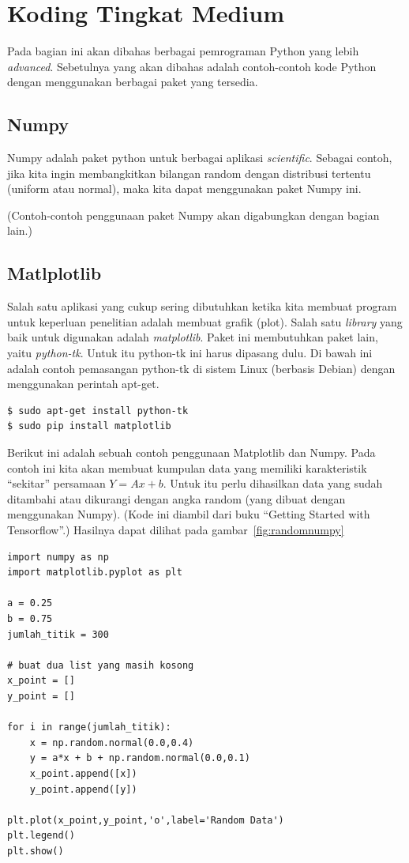 \chapter{Koding Tingkat Medium}
Pada bagian ini akan dibahas berbagai pemrograman Python yang lebih {\em advanced}. Sebetulnya yang akan dibahas adalah contoh-contoh kode Python dengan menggunakan berbagai paket yang tersedia.

\section{Numpy}
Numpy adalah paket python untuk berbagai aplikasi {\em scientific}. Sebagai contoh, jika kita ingin membangkitkan bilangan random dengan distribusi tertentu (uniform atau normal), maka kita dapat menggunakan paket Numpy ini.

(Contoh-contoh penggunaan paket Numpy akan digabungkan dengan bagian lain.)

\section{Matlplotlib}
Salah satu aplikasi yang cukup sering dibutuhkan ketika kita membuat program untuk keperluan penelitian adalah membuat grafik (plot). Salah satu {\em library} yang baik untuk digunakan adalah {\em matplotlib}. Paket ini membutuhkan paket lain, yaitu {\em python-tk}. Untuk itu python-tk ini harus dipasang dulu. Di bawah ini adalah contoh pemasangan python-tk di sistem Linux (berbasis Debian) dengan menggunakan perintah apt-get.

\begin{verbatim}
$ sudo apt-get install python-tk
$ sudo pip install matplotlib
\end{verbatim}

Berikut ini adalah sebuah contoh penggunaan Matplotlib dan Numpy. Pada contoh ini kita akan membuat kumpulan data yang memiliki karakteristik ``sekitar'' persamaan 
$Y = Ax + b$.
Untuk itu perlu dihasilkan data yang sudah ditambahi atau dikurangi dengan angka random (yang dibuat dengan menggunakan Numpy). (Kode ini diambil dari buku ``Getting Started with Tensorflow''\cite{tensorflowstarted}.)
Hasilnya dapat dilihat pada gambar~\ref{fig:randomnumpy}


\begin{verbatim}
import numpy as np
import matplotlib.pyplot as plt

a = 0.25
b = 0.75
jumlah_titik = 300

# buat dua list yang masih kosong
x_point = []
y_point = []

for i in range(jumlah_titik):
    x = np.random.normal(0.0,0.4)
    y = a*x + b + np.random.normal(0.0,0.1)
    x_point.append([x])
    y_point.append([y])

plt.plot(x_point,y_point,'o',label='Random Data')
plt.legend()
plt.show()
\end{verbatim}


